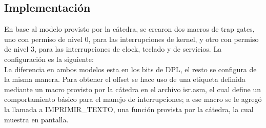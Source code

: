 \documentclass[10pt, a4paper]{article}
\begin{document}
\subsection{Implementación}
En base al modelo provisto por la cátedra, se crearon dos macros de trap gates, uno con permiso de nivel 0, para las interrupciones de kernel, y otro con permiso de nivel 3, para las interrupciones de clock, teclado y de servicios. La configuración es la siguiente:
\\
La diferencia en ambos modelos esta en los bits de DPL, el resto se configura de la misma manera.
Para obtener el offset se hace uso de una etiqueta definida mediante un macro provisto por la cátedra en el archivo isr.asm, el cual define un comportamiento básico para el manejo de interrupciones; a ese macro se le agregó la llamada a IMPRIMIR\_TEXTO, una función provista por la cátedra, la cual muestra en pantalla.
\\
\end{document}
